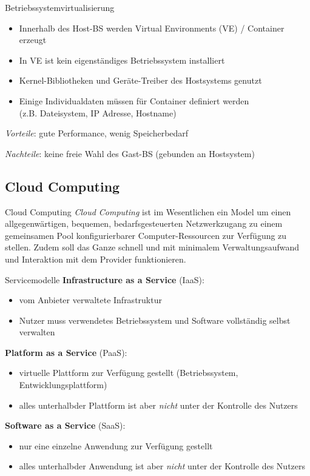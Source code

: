\documentclass[german]{spicker}
\begin{document}
\begin{defi}{Betriebssystemvirtualisierung}
    \begin{itemize}
        \item Innerhalb des Host-BS werden Virtual Environments (VE) / Container erzeugt
        \item In VE ist kein eigenständiges Betriebssystem installiert
        \item Kernel-Bibliotheken und Geräte-Treiber des Hostsystems genutzt
        \item Einige Individualdaten müssen für Container definiert werden \\ (z.B. Dateisystem, IP Adresse, Hostname)
    \end{itemize}

    \emph{Vorteile}: gute Performance, wenig Speicherbedarf

    \emph{Nachteile}: keine freie Wahl des Gast-BS (gebunden an Hostsystem)
\end{defi}

\subsection{Cloud Computing}

\begin{defi}{Cloud Computing}
    \emph{Cloud Computing} ist im Wesentlichen ein Model um einen allgegenwärtigen,
    bequemen, bedarfsgesteuerten Netzwerkzugang zu einem gemeinsamen Pool konfigurierbarer
    Computer-Ressourcen zur Verfügung zu stellen. Zudem soll das Ganze
    schnell und mit minimalem Verwaltungsaufwand und Interaktion mit dem Provider
    funktionieren.
\end{defi}

\begin{defi}{Servicemodelle}
    \textbf{Infrastructure as a Service} (IaaS):
    \begin{itemize}
        \item vom Anbieter verwaltete Infrastruktur
        \item Nutzer muss verwendetes Betriebssystem und Software vollständig selbst verwalten
    \end{itemize}

    \textbf{Platform as a Service} (PaaS):
    \begin{itemize}
        \item virtuelle Plattform zur Verfügung gestellt (Betriebssystem, Entwicklungsplattform)
        \item alles \glqq unterhalb\grqq der Plattform ist aber \emph{nicht} unter der Kontrolle des Nutzers
    \end{itemize}

    \textbf{Software as a Service} (SaaS):
    \begin{itemize}
        \item nur eine einzelne Anwendung zur Verfügung gestellt
        \item alles \glqq unterhalb\grqq der Anwendung ist aber \emph{nicht} unter der Kontrolle des Nutzers
    \end{itemize}
\end{defi}
\end{document}

